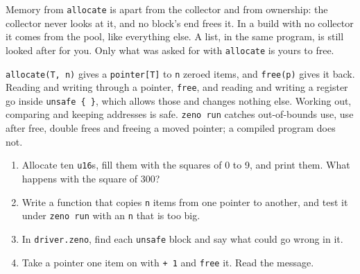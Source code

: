 Memory from \verb|allocate| is apart from the collector and from
ownership: the collector never looks at it, and no block's end frees
it. In a build with no collector it comes from the pool, like
everything else. A list, in the same program, is still looked after
for you. Only what was asked for with \verb|allocate| is yours to free.

\begin{summary}
\verb|allocate(T, n)| gives a \verb|pointer[T]| to \verb|n| zeroed
items, and \verb|free(p)| gives it back. Reading and writing through a
pointer, \verb|free|, and reading and writing a register go inside
\verb|unsafe { }|, which allows those and changes nothing else.
Working out, comparing and keeping addresses is safe. \verb|zeno run|
catches out-of-bounds use, use after free, double frees and freeing a
moved pointer; a compiled program does not.
\end{summary}

\begin{tryit}
\begin{enumerate}
\item Allocate ten \verb|u16|s, fill them with the squares of 0 to 9,
  and print them. What happens with the square of 300?
\item Write a function that copies \verb|n| items from one pointer to
  another, and test it under \verb|zeno run| with an \verb|n| that is
  too big.
\item In \verb|driver.zeno|, find each \verb|unsafe| block and say what
  could go wrong in it.
\item Take a pointer one item on with \verb|+ 1| and \verb|free| it.
  Read the message.
\end{enumerate}
\end{tryit}

